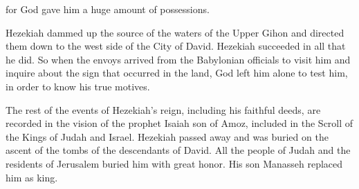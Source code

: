 {for
God
gave
him a huge
amount
of possessions.
\par }{\PP {}Hezekiah
dammed
up the
source of the waters
of the Upper
Gihon
and directed
them down to the west side
of the City
of David.
Hezekiah
succeeded
in all
that he did.
So
when the envoys
arrived from the Babylonian
officials
to visit
him and inquire
about the sign
that
occurred
in the land,
God
left
him alone to test
him, in order to know
his true motives.
\par }{\PP {}The rest
of the events
of Hezekiah’s
reign, including his faithful
deeds, are recorded
in the vision
of the prophet
Isaiah
son
of Amoz,
included in the Scroll
of the Kings
of Judah
and Israel.
Hezekiah
passed away
and was buried
on the ascent
of the tombs
of the descendants
of David.
All
the people of Judah
and the residents
of Jerusalem
buried
him with great honor.
His son
Manasseh
replaced
him as king.

}
